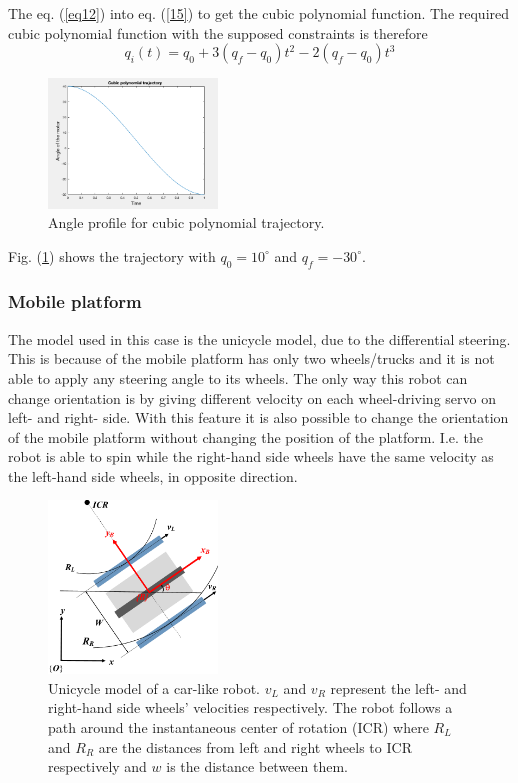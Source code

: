 The eq. (\ref{eq12}) into eq. (\ref{15}) to get the cubic polynomial function. The required cubic polynomial function with the supposed constraints is therefore
\begin{equation}
    q_i(t) = q_0 + 3(q_f - q_0)t^2 - 2(q_f - q_0)t^3
\end{equation}
\begin{figure}[ht]
    \centering
    \includegraphics[width=0.4\textwidth]{sections/assets/cubic.png}
    \caption{Angle profile for cubic polynomial trajectory.}
    \label{fig2}
\end{figure}
Fig. (\ref{fig2}) shows the trajectory with $q_0 = 10^\circ$ and $q_f = -30^\circ$.


\subsubsection{Mobile platform}
\label{subsubsec:unicycle}
The model used in this case is the unicycle model, due to the differential steering.
This is because of the mobile platform has only two wheels/trucks and it is not able to apply any steering angle to its wheels.
The only way this robot can change orientation is by giving different velocity on each wheel-driving servo on left- and right- side.
With this feature it is also possible to change the orientation of the mobile platform without changing the position of the platform.
I.e. the robot is able to spin while the right-hand side wheels have the same velocity as the left-hand side wheels, in opposite direction.
\begin{figure}[h]
\centering
\includegraphics[width=0.4\textwidth]{sections/assets/car-unicycle.png}
\caption{Unicycle model of a car-like robot.
$v_L$ and $v_R$ represent the left- and right-hand side wheels' velocities respectively.
The robot follows a path around the instantaneous center of rotation (ICR) where $R_L$ and $R_R$ are the distances from left and right wheels to ICR respectively and $w$ is the distance between them.}
\label{fig:UnicycleModel}
\end{figure}

